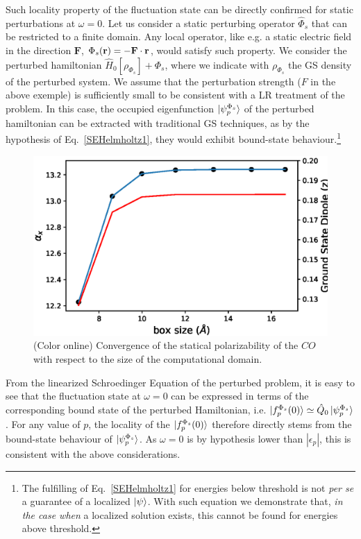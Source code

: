 \documentclass[reprint,aps,prb]{revtex4-1}
\renewcommand{\r}{{\bf r}}
\newcommand{\eps}{\epsilon}
\newcommand{\op}[1]{\hat {#1}}
\newcommand{\hnot}{\op{H}_0}
\begin{document}
Such locality property of the fluctuation state can be directly confirmed for static perturbations at $\omega=0$.
Let us consider a static perturbing operator $\op\Phi_s$ that can be restricted to a finite domain. 
Any local operator, like e.g. a static electric field in the direction $\mathbf F$, $\Phi_s(\r) = -\mathbf F \cdot \r$, would satisfy such property.
We consider the perturbed hamiltonian $\hnot[\rho_{\Phi_s}] + \Phi_s$, where we indicate with $\rho_{\Phi_s}$ the GS density of the
perturbed system. We assume that the perturbation strength ($F$ in the above exemple) is sufficiently small to be consistent with a LR 
treatment of the problem. 
In this case, the occupied eigenfunction $\ket{\psi_p^{\Phi_s}}$ of the perturbed hamiltonian 
can be extracted with traditional GS techniques, as by the hypothesis of Eq.~\eqref{SEHelmholtz1},
they would exhibit bound-state behaviour.\footnote{The fulfilling of Eq.~\eqref{SEHelmholtz1} for energies below threshold
is not \textit{per se} a guarantee of a localized $\ket{\psi}$. With such equation we demonstrate that, \emph{in the case when} a localized
solution exists, this cannot be found for energies above threshold.}
\begin{figure}[t]
\includegraphics[scale=0.56]{CO_alpha+D0_vsBoxSize.eps}
\caption{\label{co_alphaStatic}(Color online) Convergence of the statical polarizability of the $CO$ with respect to the size of the computational domain.}
\end{figure}

From the linearized Schroedinger Equation of the perturbed problem, it is easy to see that the fluctuation state at $\omega=0$ can be expressed
in terms of the corresponding bound state of the perturbed Hamiltonian, i.e.
$\ket{f_p^{\Phi_s}(0)} \simeq \op Q_0 \ket{\psi_p^{\Phi_s}}$.
For any value of $p$, the locality of the $\ket{f_p^{\Phi_s}(0)}$ therefore directly stems from the
bound-state behaviour of $\ket{\psi_p^{\Phi_s}}$. As $\omega=0$ is by hypothesis 
lower than $|\eps_p|$, this is consistent with the above considerations.
\end{document}
